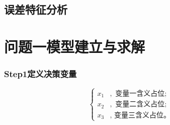 \documentclass{JXUSTmodeling}
\begin{document}

\subsection{误差特征分析}


\section{问题一模型建立与求解}

\subsubsection*{Step1定义决策变量}

\begin{equation*}
	\left\{
	\begin{aligned}
		x_1 &,\text{ 变量一含义占位};\\
		x_2 &,\text{ 变量二含义占位};\\
		x_3 &,\text{ 变量三含义占位。}
	\end{aligned}
	\right.
\end{equation*}
\end{document}
